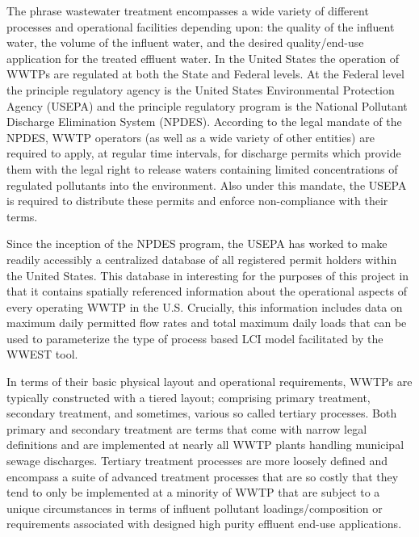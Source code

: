 The phrase wastewater treatment encompasses a wide variety of different processes and operational facilities depending upon: the quality of the influent water, the volume of the influent water, and the desired quality/end-use application for the treated effluent water. In the United States the operation of WWTPs are regulated at both the State and Federal levels. At the Federal level the principle regulatory agency is the United States Environmental Protection Agency (USEPA) and the principle regulatory program is the National Pollutant Discharge Elimination System (NPDES). According to the legal mandate of the NPDES, WWTP operators (as well as a wide variety of other entities) are required to apply, at regular time intervals, for discharge permits which provide them with the legal right to release waters containing limited concentrations of regulated pollutants into the environment. Also under this mandate, the USEPA is required to distribute these permits and enforce non-compliance with their terms.

Since the inception of the NPDES program, the USEPA has worked to make readily accessibly a centralized database of all registered permit holders within the United States. This database in interesting for the purposes of this project in that it contains spatially referenced information about the operational aspects of every operating WWTP in the U.S. Crucially, this information includes data on maximum daily permitted flow rates and total maximum daily loads that can be used to parameterize the type of process based LCI model facilitated by the WWEST tool.

In terms of their basic physical layout and operational requirements, WWTPs are typically constructed with a tiered layout; comprising primary treatment, secondary treatment, and sometimes, various so called tertiary processes. Both primary and secondary treatment are terms that come with narrow legal definitions and are implemented at nearly all WWTP plants handling municipal sewage discharges. Tertiary treatment processes are more loosely defined and encompass a suite of advanced treatment processes that are so costly that they tend to only be implemented at a minority of WWTP that are subject to a unique  circumstances in terms of influent pollutant loadings/composition or requirements associated with designed high purity effluent end-use applications.

